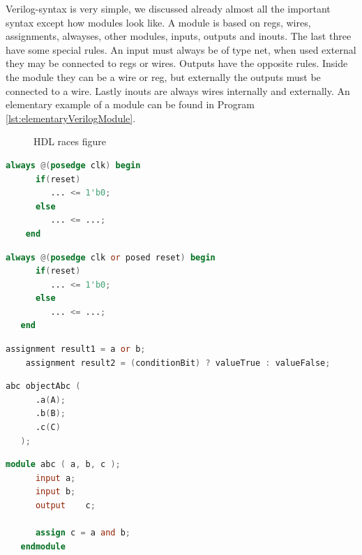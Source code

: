 \documentclass[12pt,a4paper,english,twoside,openright]{tutthesis}
\begin{document}
Verilog-syntax is very simple, we discussed already almost all the important syntax except how modules look like. A module is based on regs, wires, assignments, alwayses, other modules, inputs, outputs and inouts. The last three have some special rules. An input must always be of type net, when used external they may be connected to regs or wires. Outputs have the opposite rules. Inside the module they can be a wire or reg, but externally the outputs must be connected to a wire. Lastly inouts are always wires internally and externally. An elementary example of a module can be found in Program \ref{lst:elementaryVerilogModule}.
\begin{figure}
	\centering
	
	\caption{HDL races figure}
	\label{fig:races}
\end{figure}
\begin{lstlisting}[caption={Verilog example, synchronous reset},label={lst:VerilogSynReset},language=Verilog, float=h]
   always @(posedge clk) begin
      if(reset)
         ... <= 1'b0;
      else
         ... <= ...;
    end
\end{lstlisting}
\begin{lstlisting}[caption={Verilog example, assynchronous reset},label={lst:VerilogAssynReset},language=Verilog, float=h]
   always @(posedge clk or posed reset) begin
      if(reset)
         ... <= 1'b0;
      else
         ... <= ...;
   end
\end{lstlisting}
\begin{lstlisting}[caption={Verilog example assignments},label={lst:VerilogAssignment},language=Verilog, float=h]
	assignment result1 = a or b;
	assignment result2 = (conditionBit) ? valueTrue : valueFalse;
\end{lstlisting}
\begin{lstlisting}[caption={Verilog example, using a module},label={lst:VerilogModule},language=Verilog, float=h]
   abc objectAbc (
      .a(A);
      .b(B);
      .c(C)
   );
\end{lstlisting}
\begin{lstlisting}[caption={Verilog example, defining a module},label={lst:elementaryVerilogModule},language=Verilog, float=h]
   module abc ( a, b, c );
      input	a;
      input	b;
      output	c;
	
      assign c = a and b;
   endmodule
\end{lstlisting}
\end{document}
